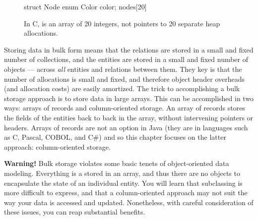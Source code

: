 \begin{figure}
\centering
\vspace{-4mm}
\begin{framedlisting}
struct Node {
  enum Color color;
} nodes[20]
\end{framedlisting}
\caption{In C,  is an array of 20 integers, not
pointers to 20 separate heap allocations.}
\end{figure}
Storing data in bulk form means that the relations are stored in a small and
fixed number of collections, and the entities are stored in a small and fixed
number of objects --- across \emph{all} entities and relations between them.
They key is that the number of allocations is small and fixed, and therefore
object header overheads (and allocation costs) are easily amortized. The trick
to accomplishing a bulk storage approach is to store data in large arrays. This
can be accomplished in two ways: arrays of records and column-oriented storage.
An array of records stores the fields of the entities back to back in the array,
without intervening pointers or headers. Arrays of records are not an option in
Java (they are in languages such as C, Pascal, COBOL, and C\#) and so this
chapter focuses on the latter approach: column-oriented storage.


\textbf{Warning!} Bulk storage violates some basic tenets of object-oriented
data modeling. Everything is a stored in an array, and thus there are no objects
to encapsulate the state of an individual entity. You will learn that
subclassing is more difficult to express, and
that a column-oriented approach may not suit the way your data is accessed and
updated.
Nonetheless, with careful consideration of these issues, you can reap
substantial benefits.







